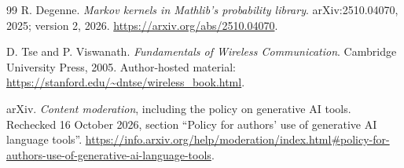 \documentclass[11pt]{article}
\begin{document}
\begin{thebibliography}{99}
R. Degenne.
\emph{Markov kernels in Mathlib's probability library}.
arXiv:2510.04070, 2025; version 2, 2026.
\url{https://arxiv.org/abs/2510.04070}.

D. Tse and P. Viswanath.
\emph{Fundamentals of Wireless Communication}.
Cambridge University Press, 2005.
Author-hosted material: \url{https://stanford.edu/~dntse/wireless_book.html}.

arXiv. \emph{Content moderation}, including the policy on generative AI tools.
Rechecked 16 October 2026, section ``Policy for authors' use of generative AI
language tools''.
\url{https://info.arxiv.org/help/moderation/index.html#policy-for-authors-use-of-generative-ai-language-tools}.
\end{thebibliography}
\end{document}
